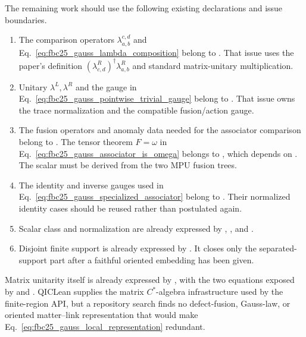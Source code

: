 \documentclass{article}
\begin{document}
The remaining work should use the following existing declarations and issue
boundaries.

\begin{enumerate}
    \item The comparison operators $\lambda_{a,b}^{c,d}$ and
    Eq.~\ref{eq:fbc25_gauss_lambda_composition} belong to .
    That issue uses the paper's definition
    $(\lambda^R_{c,d})^\dagger\lambda^R_{a,b}$ and standard matrix-unitary
    multiplication.

    \item Unitary $\lambda^L,\lambda^R$ and the gauge in
    Eq.~\ref{eq:fbc25_gauss_pointwise_trivial_gauge} belong to
    .  That issue owns the trace normalization and the
    compatible fusion/action gauge.

    \item The fusion operators and anomaly data needed for the associator
    comparison belong to .  The tensor theorem $F=\omega$ in
    Eq.~\ref{eq:fbc25_gauss_associator_is_omega} belongs to ,
    which depends on .  The scalar must be derived from the two
    MPU fusion trees.

    \item The identity and inverse gauges used in
    Eq.~\ref{eq:fbc25_gauss_specialized_associator} belong to
    .  Their normalized identity cases should be reused rather
    than postulated again.

    \item Scalar class and normalization are already expressed by
    ,
    , and
    .

    \item Disjoint finite support is already expressed by
    .  It closes only
    the separated-support part after a faithful oriented embedding has been
    given.
\end{enumerate}

Matrix unitarity itself is already expressed by
, with the two equations exposed by
 and
.  QICLean supplies the matrix
$C^*$-algebra infrastructure used by the finite-region API, but a repository
search finds no defect-fusion, Gauss-law, or oriented matter--link
representation that would make
Eq.~\ref{eq:fbc25_gauss_local_representation} redundant.
\end{document}
